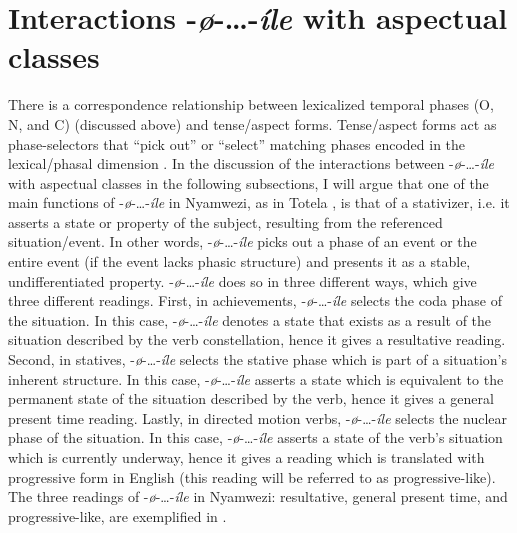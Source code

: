 \documentclass[output=paper,newtxmath,modfonts,nonflat,draftmode]{langsci/langscibook}
\begin{document}
\section{Interactions -\textit{ø}-…-\textit{íle} with aspectual classes}

\label{sec:kanijo:4}

There is a correspondence relationship between lexicalized temporal phases (O, N, and C) (discussed above) and tense/aspect forms. Tense/aspect forms act as phase-selectors that “pick out” or “select” matching phases encoded in the lexical/phasal dimension \citep[223]{Sasse2002}. In the discussion of the interactions between -\textit{ø}-…-\textit{íle} with aspectual classes in the following subsections, I will argue that one of the main functions of -\textit{ø}-…-\textit{íle} in Nyamwezi, as in Totela \citep{Crane2013}, is that of a stativizer, i.e. it asserts a state or property of the subject, resulting from the referenced situation/event. In other words, -\textit{ø}-…-\textit{íle} picks out a phase of an event or the entire event (if the event lacks phasic structure) and presents it as a stable, undifferentiated property. -\textit{ø}-…-\textit{íle} does so in three different ways, which give three different readings. First, in achievements, -\textit{ø}-…-\textit{íle} selects the coda phase of the situation. In this case, -\textit{ø}-…-\textit{íle} denotes a state that exists as a result of the situation described by the verb constellation, hence it gives a resultative reading. Second, in statives, -\textit{ø}-…-\textit{íle} selects the stative phase which is part of a situation’s inherent structure. In this case, -\textit{ø}-…-\textit{íle} asserts a state which is equivalent to the permanent state of the situation described by the verb, hence it gives a general present time reading. Lastly, in directed motion verbs, -\textit{ø}-…-\textit{íle} selects the nuclear phase of the situation. In this case, -\textit{ø}-…-\textit{íle} asserts a state of the verb’s situation which is currently underway, hence it gives a reading which is translated with progressive form in English (this reading will be referred to as progressive-like). The three readings of -\textit{ø}-…-\textit{íle} in Nyamwezi: resultative, general present time, and progressive-like, are exemplified in . 
\end{document}
